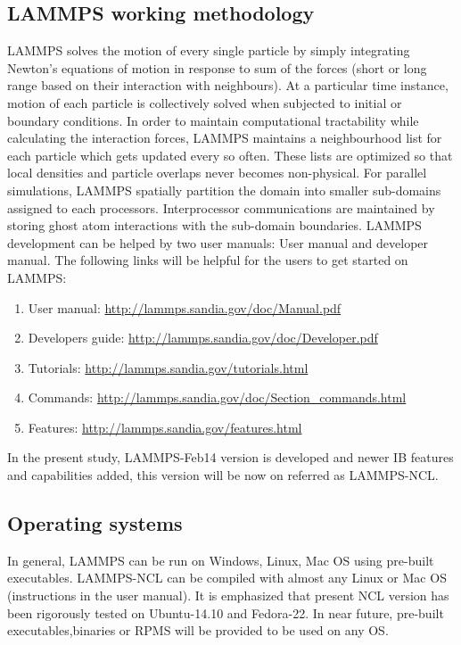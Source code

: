 \documentclass[11pt,a4paper,openright]{article}
\begin{document}
\subsection{LAMMPS working methodology}
LAMMPS solves the motion of every single particle by simply integrating Newton's equations of motion in response to sum of the forces (short or long range based on their interaction with neighbours). At a particular time instance, motion of each particle is collectively solved when subjected to initial or boundary conditions. In order to maintain computational tractability while calculating the interaction forces, LAMMPS maintains a neighbourhood list for each particle which gets updated every so often. These lists are optimized so that local densities and particle overlaps never becomes non-physical. For parallel simulations, LAMMPS spatially partition the domain into smaller sub-domains assigned to each processors. Interprocessor communications are maintained by storing ghost atom interactions with the sub-domain boundaries. LAMMPS development can be helped by two user manuals: User manual and developer manual. The following links will be helpful for the users to get started on LAMMPS:

\begin{enumerate}
\item User manual: \url{http://lammps.sandia.gov/doc/Manual.pdf}
\item Developers guide: \url{http://lammps.sandia.gov/doc/Developer.pdf}
\item Tutorials: \url{http://lammps.sandia.gov/tutorials.html}
\item Commands: \url{http://lammps.sandia.gov/doc/Section_commands.html}
\item Features: \url{http://lammps.sandia.gov/features.html}
\end{enumerate}

In the present study, LAMMPS-Feb14 version is developed and newer IB features and capabilities added, this version will be now on referred as LAMMPS-NCL. 

\subsection{Operating systems}
In general, LAMMPS can be run on Windows, Linux, Mac OS using pre-built executables. LAMMPS-NCL can be compiled with almost any Linux or Mac OS (instructions in the user manual). It is emphasized that present NCL version has been rigorously tested on Ubuntu-14.10 and Fedora-22. In near future, pre-built executables,binaries or RPMS will be provided to be used on any OS.
\end{document}
